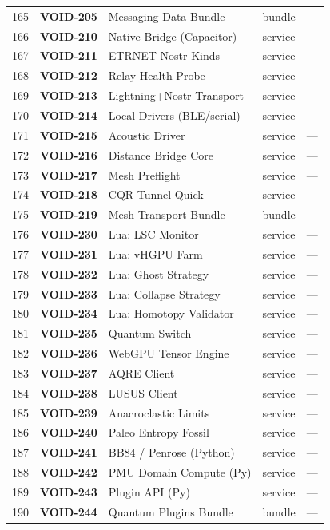 \documentclass[10pt,a4paper,landscape]{article}
\begin{document}
\begin{longtable}{@{}rl p{4.2cm} p{1.4cm} p{3.8cm}@{}}
165 & \textbf{VOID-205} & Messaging Data Bundle & bundle & — \\
166 & \textbf{VOID-210} & Native Bridge (Capacitor) & service & — \\
167 & \textbf{VOID-211} & ETRNET Nostr Kinds & service & — \\
168 & \textbf{VOID-212} & Relay Health Probe & service & — \\
169 & \textbf{VOID-213} & Lightning+Nostr Transport & service & — \\
170 & \textbf{VOID-214} & Local Drivers (BLE/serial) & service & — \\
171 & \textbf{VOID-215} & Acoustic Driver & service & — \\
172 & \textbf{VOID-216} & Distance Bridge Core & service & — \\
173 & \textbf{VOID-217} & Mesh Preflight & service & — \\
174 & \textbf{VOID-218} & CQR Tunnel Quick & service & — \\
175 & \textbf{VOID-219} & Mesh Transport Bundle & bundle & — \\
176 & \textbf{VOID-230} & Lua: LSC Monitor & service & — \\
177 & \textbf{VOID-231} & Lua: vHGPU Farm & service & — \\
178 & \textbf{VOID-232} & Lua: Ghost Strategy & service & — \\
179 & \textbf{VOID-233} & Lua: Collapse Strategy & service & — \\
180 & \textbf{VOID-234} & Lua: Homotopy Validator & service & — \\
181 & \textbf{VOID-235} & Quantum Switch & service & — \\
182 & \textbf{VOID-236} & WebGPU Tensor Engine & service & — \\
183 & \textbf{VOID-237} & AQRE Client & service & — \\
184 & \textbf{VOID-238} & LUSUS Client & service & — \\
185 & \textbf{VOID-239} & Anacroclastic Limits & service & — \\
186 & \textbf{VOID-240} & Paleo Entropy Fossil & service & — \\
187 & \textbf{VOID-241} & BB84 / Penrose (Python) & service & — \\
188 & \textbf{VOID-242} & PMU Domain Compute (Py) & service & — \\
189 & \textbf{VOID-243} & Plugin API (Py) & service & — \\
190 & \textbf{VOID-244} & Quantum Plugins Bundle & bundle & — \\

\end{longtable}
\end{document}
